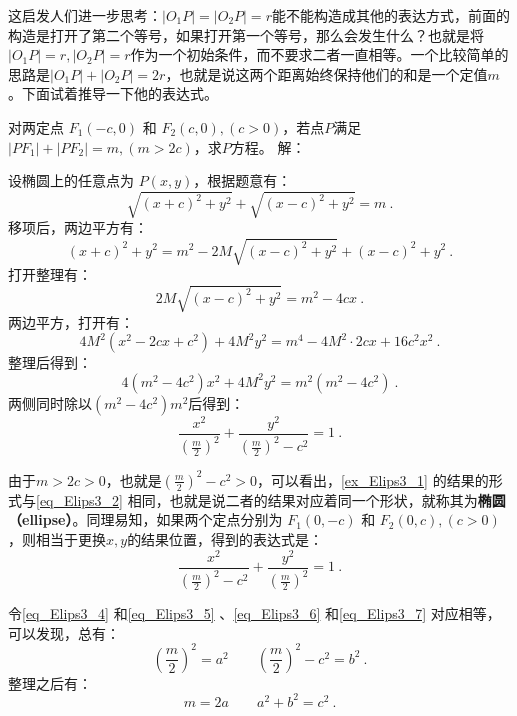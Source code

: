 这启发人们进一步思考：$|O_1P|=|O_2P|=r$能不能构造成其他的表达方式，前面的构造是打开了第二个等号，如果打开第一个等号，那么会发生什么？也就是将$|O_1P|=r,|O_2P|=r$作为一个初始条件，而不要求二者一直相等。一个比较简单的思路是$|O_1P|+|O_2P|=2r$，也就是说这两个距离始终保持他们的和是一个定值$m$。下面试着推导一下他的表达式。

\begin{example}{对两定点 $F_1(-c, 0)$ 和 $F_2(c, 0),(c>0)$，若点$P$满足$|PF_1| + |PF_2| = m,(m > 2c)$，求$P$方程。}\label{ex_Elips3_1}
解：

设椭圆上的任意点为 $P(x, y)$，根据题意有：
\begin{equation}
\sqrt{(x + c)^2 + y^2} + \sqrt{(x - c)^2 + y^2} = m~.
\end{equation}
移项后，两边平方有：
\begin{equation}
(x + c)^2 + y^2 = m^2 - 2M\sqrt{(x - c)^2 + y^2} + (x - c)^2 + y^2~.
\end{equation}
打开整理有：
\begin{equation}
2M\sqrt{(x - c)^2 + y^2}= m^2 - 4cx~.
\end{equation}
两边平方，打开有：
\begin{equation}
4M^2(x^2 - 2cx+c^2) + 4M^2y^2= m^4-4M^2\cdot2cx+16c^2x^2~.
\end{equation}
整理后得到：
\begin{equation}
4(m^2 -4c^2)x^2 + 4M^2y^2= m^2(m^2-4c^2)~.
\end{equation}
两侧同时除以$(m^2-4c^2)m^2$后得到：
\begin{equation}\label{eq_Elips3_4}
\frac{x^2}{\left(\displaystyle\frac{m}{2}\right)^2} + \frac{y^2}{\displaystyle\left(\frac{m}{2}\right)^2-c^2}=1~.
\end{equation}
\end{example}

由于$m>2c>0$，也就是$\displaystyle\left(\frac{m}{2}\right)^2-c^2>0$，可以看出，\autoref{ex_Elips3_1} 的结果的形式与\autoref{eq_Elips3_2} 相同，也就是说二者的结果对应着同一个形状，就称其为\textbf{椭圆（ellipse）}。同理易知，如果两个定点分别为 $F_1(0,-c)$ 和 $F_2(0,c),(c>0)$，则相当于更换$x,y$的结果位置，得到的表达式是：
\begin{equation}\label{eq_Elips3_6}
\frac{x^2}{\displaystyle\left(\frac{m}{2}\right)^2-c^2}+\frac{y^2}{\left(\displaystyle\frac{m}{2}\right)^2} =1~.
\end{equation}

令\autoref{eq_Elips3_4} 和\autoref{eq_Elips3_5} 、\autoref{eq_Elips3_6} 和\autoref{eq_Elips3_7} 对应相等，可以发现，总有：
\begin{equation}
\left(\frac{m}{2}\right)^2=a^2\qquad
\left(\frac{m}{2}\right)^2-c^2=b^2~.
\end{equation}
整理之后有：
\begin{equation}\label{eq_Elips3_8}
m=2a\qquad
a^2+b^2=c^2~.
\end{equation}

